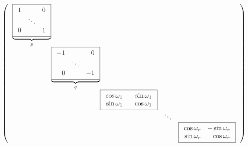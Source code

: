 \documentclass{article}
\newcommand\tikzmark[1]{%
  \tikz[overlay,remember picture,baseline] \coordinate [anchor=base] (#1);}
\newcommand\DrawBrace[3]{%
  \draw [decorate,decoration={brace,amplitude=3pt,mirror,raise=15pt}]
    (#1) -- (#2) node [black,midway,sloped,yshift=-10pt] {\footnotesize$#3$};
}
\begin{document}
\begin{preview}
\begin{equation*}
\left( \,
\begin{array}{r@{}r@{}r r r}  %
  \underbrace{
  \boxed{ 
    \begin{array}{rrr}              %
        1  &        & 0\\
           & \ddots &  \\
        0  &        & 1\\
    \end{array}
  }}_{p} \\
  & 
  \underbrace{
  \boxed{
    \begin{array}{rrr}            %
       -1  &        & 0 \\
           & \ddots &   \\
        0  &        & -1\\
    \end{array}
  }}_{q} \\
   & & \boxed{
          \begin{array}{rr}           %
            \cos \omega_1 & -\sin \omega_1\\
            \sin \omega_1 &  \cos \omega_1\\
          \end{array} 
        } \\
  & & & \ddots\\                          %
  & \tikzmark{a}& & & \boxed{
            \begin{array}{rr}       %
                \cos \omega_r & -\sin \omega_r\\
                \sin \omega_r &  \cos \omega_r\\
            \end{array}
          } \tikzmark{b} \\
\end{array}\,\right)
\end{equation*}


\end{preview}
\end{document}
